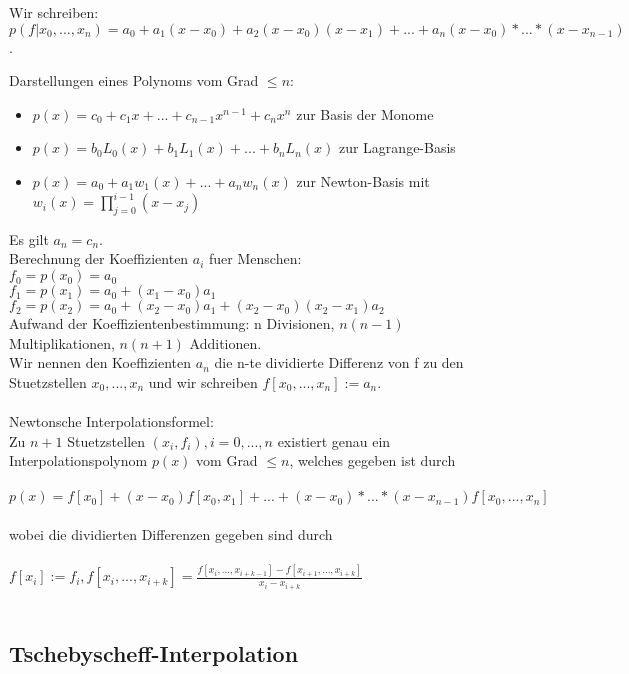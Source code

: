 \documentclass[a4paper]{scrreprt}
\begin{document}
Wir schreiben:\\
$p(f|x_0,...,x_n) = a_0 + a_1(x - x_0) + a_2(x - x_0)(x - x_1) + ... + a_n(x - x_0)*...*(x - x_{n-1})$.

Darstellungen eines Polynoms vom Grad $\leq n$:
\begin{itemize}
	\item $p(x) = c_0 + c_1x + ... + c_{n-1}x^{n-1} + c_nx^n$ zur Basis der Monome
	\item $p(x) = b_0L_0(x) + b_1L_1(x) + ... + b_nL_n(x)$ zur Lagrange-Basis
	\item $p(x) = a_0 + a_1w_1(x) + ... + a_nw_n(x)$ zur Newton-Basis mit $w_i(x) = \prod_{j=0}^{i-1}(x - x_j)$
\end{itemize}

Es gilt $a_n = c_n$.\\

Berechnung der Koeffizienten $a_i$ fuer Menschen:\\
$f_0 = p(x_0) = a_0$\\
$f_1 = p(x_1) = a_0 + (x_1 - x_0)a_1$\\
$f_2 = p(x_2) = a_0 + (x_2 - x_0)a_1 + (x_2 - x_0)(x_2 - x_1)a_2$\\

Aufwand der Koeffizientenbestimmung: n Divisionen, $n(n-1)$ Multiplikationen, $n(n+1)$ Additionen.\\

Wir nennen den Koeffizienten $a_n$ die n-te dividierte Differenz von f zu den Stuetzstellen $x_0,...,x_n$ und wir schreiben $f[x_0,...,x_n] := a_n$.\\\\

Newtonsche Interpolationsformel:\\
Zu $n+1$ Stuetzstellen $(x_i,f_i), i=0,...,n$ existiert genau ein Interpolationspolynom $p(x)$ vom Grad $\leq n$, welches gegeben ist durch\\\\
$p(x) = f[x_0] + (x-x_0)f[x_0,x_1] + ...+ (x-x_0)*...*(x-x_{n-1})f[x_0,...,x_n]$\\\\wobei die dividierten Differenzen gegeben sind durch\\\\
$f[x_i]:=f_i, f[x_i,...,x_{i+k}] = \frac{f[x_i,...,x_{i+k-1}]-f[x_{i+1},...,x_{i+k}]}{x_i - x_{i+k}}$\\\\

\subsection{Tschebyscheff-Interpolation}
\end{document}
